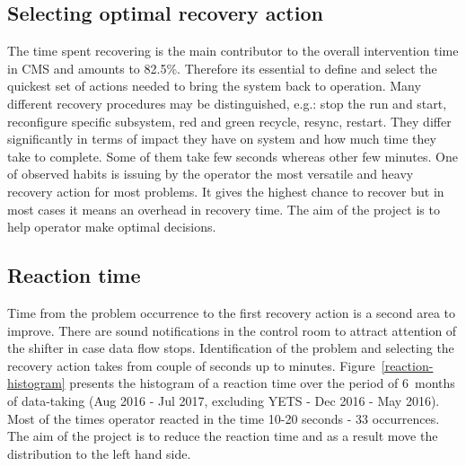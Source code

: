 \documentclass[a4paper]{jpconf}
\begin{document}
\subsection{Selecting optimal recovery action}
The time spent recovering is the main contributor to the overall intervention time in CMS and amounts to 82.5\%. Therefore its essential to define and select the quickest set of actions needed to bring the system back to operation. Many different recovery procedures may be distinguished, e.g.: stop the run and start, reconfigure specific subsystem, red and green recycle, resync, restart. They differ significantly in terms of impact they have on system and how much time they take to complete. Some of them take few seconds whereas other few minutes. One of observed habits is issuing by the operator the most versatile and heavy recovery action for most problems. It gives the highest chance to recover but in most cases it means an overhead in recovery time. The aim of the project is to help operator make optimal decisions.

\subsection{Reaction time}
Time from the problem occurrence to the first recovery action is a second area to improve. There are sound notifications in the control room to attract attention of the shifter in case data flow stops. Identification of the problem and selecting the recovery action takes from couple of seconds up to minutes. Figure~\ref{reaction-histogram} presents the histogram of a reaction time over the period of 6~months of data-taking (Aug 2016 - Jul 2017, excluding YETS - Dec 2016 - May 2016). Most of the times operator reacted in the time 10-20 seconds - 33 occurrences. The aim of the project is to reduce the reaction time and as a result move the distribution to the left hand side.
\end{document}
